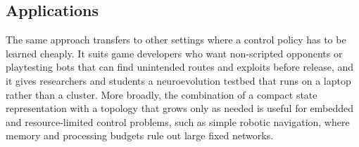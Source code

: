 \subsection{Applications}
\label{subsec:applications}

The same approach transfers to other settings where a control policy has to be
learned cheaply. It suits game developers who want non-scripted opponents or
playtesting bots that can find unintended routes and exploits before release,
and it gives researchers and students a neuroevolution testbed that runs on a
laptop rather than a cluster. More broadly, the combination of a compact state
representation with a topology that grows only as needed is useful for embedded
and resource-limited control problems, such as simple robotic navigation, where
memory and processing budgets rule out large fixed networks.
